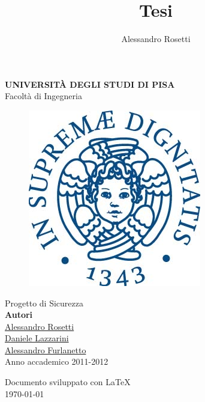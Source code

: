 \documentclass[a4paper,titlepage]{article}
\author{Alessandro Rosetti}
\title{Tesi}
\begin{document}
\begin{titlepage}
\begin{center}
\huge{\textbf{UNIVERSIT\`A DEGLI STUDI DI PISA}}\\
\LARGE{Facoltà di Ingegneria}
\begin{figure}[H]
  \centering \includegraphics[scale=0.35]{img/unipi.jpg}
\end{figure}
\vspace{2.5cm}
\Huge{Progetto di Sicurezza}\\[2.5cm]

\large{\textbf{Autori}}\\
\underline{\Large{Alessandro Rosetti}}\\
\underline{\Large{Daniele Lazzarini}}\\
\underline{\Large{Alessandro Furlanetto}}\\


\vfill
\large{Anno accademico 2011-2012}\\[2.0cm]
\end{center}
\end{titlepage}

\begin{center}
\thispagestyle{empty}
\newpage
\vfill
Documento sviluppato con \LaTeX\\
\today
\end{center}

\newpage

\tableofcontents \thispagestyle{fancy}
\newpage
\listoffigures
\newpage
\end{document}
